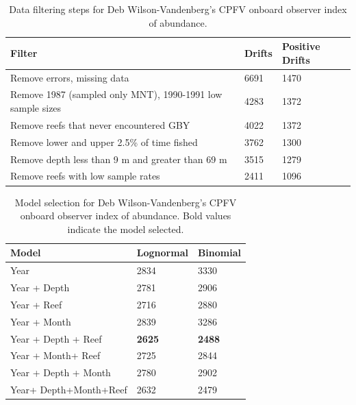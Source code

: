\documentclass[12pt,]{article}
\begin{document}
\vspace{3cm}

\begin{table}[!h]
\centering
\caption{Data filtering steps for Deb Wilson-Vandenberg's CPFV onboard observer 
                                        index of abundance.} 
\label{tab:Fleet5_Filter}
\begin{tabular}{lll}
  \hline
Filter & Drifts & Positive Drifts \\ 
  \hline
Remove errors, missing data & 6691 & 1470 \\ 
  Remove 1987 (sampled only MNT), 1990-1991 low sample sizes & 4283 & 1372 \\ 
  Remove reefs that never encountered GBY & 4022 & 1372 \\ 
  Remove lower and upper 2.5\% of time fished & 3762 & 1300 \\ 
  Remove depth less than 9 m and greater than 69 m & 3515 & 1279 \\ 
  Remove reefs with low sample rates & 2411 & 1096 \\ 
   \hline
\end{tabular}
\end{table}

\vspace{3cm}

\begin{table}[ht]
\centering
\caption{Model selection for Deb Wilson-Vandenberg's CPFV onboard observer 
                                        index of abundance. Bold values indicate the model selected.} 
\label{tab:Fleet5_AIC}
\begin{tabular}{lll}
  \hline
Model & Lognormal & Binomial \\ 
  \hline
Year & 2834 & 3330 \\ 
  Year + Depth & 2781 & 2906 \\ 
  Year + Reef & 2716 & 2880 \\ 
  Year + Month & 2839 & 3286 \\ 
  Year + Depth + Reef & \textbf{2625} & \textbf{2488} \\ 
  Year + Month+ Reef & 2725 & 2844 \\ 
  Year + Depth + Month & 2780 & 2902 \\ 
  Year+ Depth+Month+Reef & 2632 & 2479 \\ 
   \hline
\end{tabular}
\end{table}

\vspace{3cm} \FloatBarrier
\end{document}
